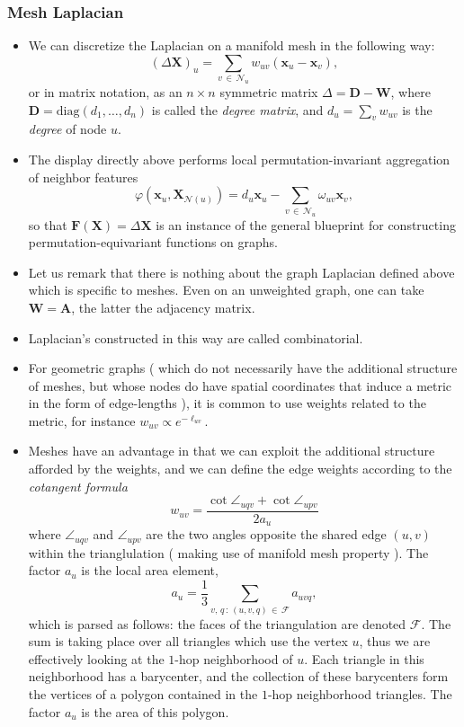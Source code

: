 \documentclass[12pt]{article}
\numberwithin{equation}{section}
\theoremstyle{definition}
\newcommand{		\1		}	{	\bm{1}					}%
\begin{document}
\subsubsection*{ Mesh Laplacian } 

\begin{itemize}
\item We can discretize the Laplacian on a manifold mesh in the following way:
$$
( \Delta \mathbf{X}) _ u = \sum_{v \, \in \, \mathcal{N}_u } w_{uv} ( \mathbf{x}_u - \mathbf{x}_v) ,
$$
or in matrix notation, as an $n \times n$ symmetric matrix $\Delta = \mathbf{D} -\mathbf{W}$, where $\mathbf{D} = \textrm{diag} ( d_1, \dots, d_n)$ is called the \emph{degree matrix}, and $d_u = \sum_v w_{uv}$ is the \emph{degree} of node $u$. 
\item The display directly above performs local permutation-invariant aggregation of neighbor features
$$
\varphi ( \mathbf{x}_u, \mathbf{X}_{\mathcal{N}(u)} ) = d_u \mathbf{x}_u - \sum_{v \, \in \, \mathcal{N}_u} \omega_{uv} \mathbf{x}_v,
$$
so that $\mathbf{F}(\mathbf{X}) = \Delta \mathbf{X}$ is an instance of the general blueprint for constructing permutation-equivariant functions on graphs. 
\item Let us remark that there is nothing about the graph Laplacian defined above which is specific to meshes. Even on an unweighted graph, one can take $\mathbf{W} =\mathbf{A}$, the latter the adjacency matrix.
\item Laplacian's constructed in this way are called combinatorial.
\item For geometric graphs ( which do not necessarily have the additional structure of meshes, but whose nodes do have spatial coordinates that induce a metric in the form of edge-lengths ), it is common to use weights related to the metric, for instance $w_{uv} \propto e^{- \ell_{uv}}$.
\item Meshes have an advantage in that we can exploit the additional structure afforded by the weights, and we can define the edge weights according to the \emph{cotangent formula}
$$
w_{uv}  =\frac{\cot \angle_{uqv} +\cot\angle_{upv}}{2a_u}
$$
where $\angle_{uqv}$ and $\angle_{upv}$ are the two angles opposite the shared edge $(u,v)$ within the trianglulation ( making use of manifold mesh property ). The factor $a_u$ is the local area element, 
$$
a_u = \frac{1}{3} \sum _{ v, \, q \,: \,(u,v,q) \, \in \, \mathcal{F} } a_{uvq},
$$
which is parsed as follows: the faces of the triangulation are denoted $\mathcal{F}$. The sum is taking place over all triangles which use the vertex $u$, thus we are effectively looking at the $1$-hop neighborhood of $u$. Each triangle in this neighborhood has a barycenter, and the collection of these barycenters form the vertices of a polygon contained in the $1$-hop neighborhood triangles. The factor $a_u$ is the area of this polygon. 

\end{itemize}
\end{document}

